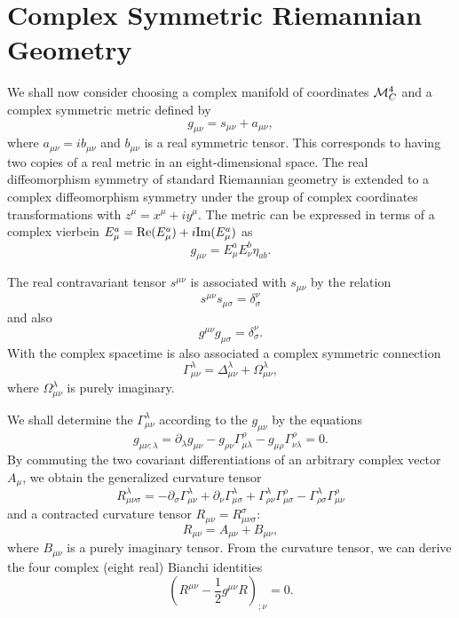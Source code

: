 \documentclass[a4paper,10pt]{article}
\begin{document}
\section{Complex Symmetric Riemannian Geometry}

We shall now consider choosing a complex manifold of coordinates ${\cal
M}_C^4$ and a complex symmetric metric defined
by~\cite{Moffat,Moffat2,Moffat3}
\begin{equation}
g_{\mu\nu}=s_{\mu\nu}+a_{\mu\nu},
\end{equation}
where $a_{\mu\nu}=ib_{\mu\nu}$ and $b_{\mu\nu}$ is a real symmetric
tensor. This corresponds to having two copies of a real metric in an
eight-dimensional space. The real diffeomorphism symmetry of standard
Riemannian geometry is extended to a complex diffeomorphism symmetry under
the group of complex coordinates transformations with $z^\mu=x^\mu+iy^\mu$.
The metric can be expressed in terms of a complex vierbein $E^a_\mu={\rm
Re}(E^a_\mu)+i{\rm Im}(E^a_\mu)$ as
\begin{equation}
\label{complexvierbein}
g_{\mu\nu}=E^a_\mu E^b_\nu\eta_{ab}.
\end{equation}

The real contravariant tensor $s^{\mu\nu}$ is associated with $s_{\mu\nu}$
by the relation
\begin{equation}
s^{\mu\nu}s_{\mu\sigma}=\delta^\nu_\sigma
\end{equation}
and also
\begin{equation}
g^{\mu\nu}g_{\mu\sigma}=\delta^\nu_\sigma.
\end{equation}
With the complex spacetime is also associated a complex symmetric
connection
\begin{equation}
\Gamma^\lambda_{\mu\nu}=\Delta^\lambda_{\mu\nu}+\Omega^\lambda_{\mu\nu},
\end{equation}
where $\Omega^\lambda_{\mu\nu}$ is purely imaginary.

We shall determine the $\Gamma^\lambda_{\mu\nu}$ according to the
$g_{\mu\nu}$ by the equations
\begin{equation}
\label{gequation}
g_{\mu\nu;\lambda}=\partial_\lambda
g_{\mu\nu}-g_{\rho\nu}\Gamma^\rho_{\mu\lambda}-g_{\mu\rho}\Gamma^\rho_{\nu\lambda}=0.
\end{equation}
By commuting the two covariant differentiations of an arbitrary complex
vector $A_\mu$, we obtain the generalized curvature tensor
\begin{equation}
R^\lambda_{\mu\nu\sigma}=-\partial_\sigma\Gamma^\lambda_{\mu\nu}
+\partial_\nu\Gamma^\lambda_{\mu\sigma}+\Gamma^\lambda_{\rho\nu}\Gamma^\rho_{\mu\sigma}
-\Gamma^\lambda_{\rho\sigma}\Gamma^\rho_{\mu\nu}
\end{equation}
and a contracted curvature tensor $R_{\mu\nu}=R^\sigma_{\mu\nu\sigma}$:
\begin{equation}
R_{\mu\nu}=A_{\mu\nu}+B_{\mu\nu},
\end{equation}
where $B_{\mu\nu}$ is a purely imaginary tensor.
From the curvature tensor, we can derive the four complex (eight real)
Bianchi identities \begin{equation}
\label{Bianchi}
(R^{\mu\nu}-\frac{1}{2}g^{\mu\nu}R)_{;\nu}=0.
\end{equation}
\end{document}
